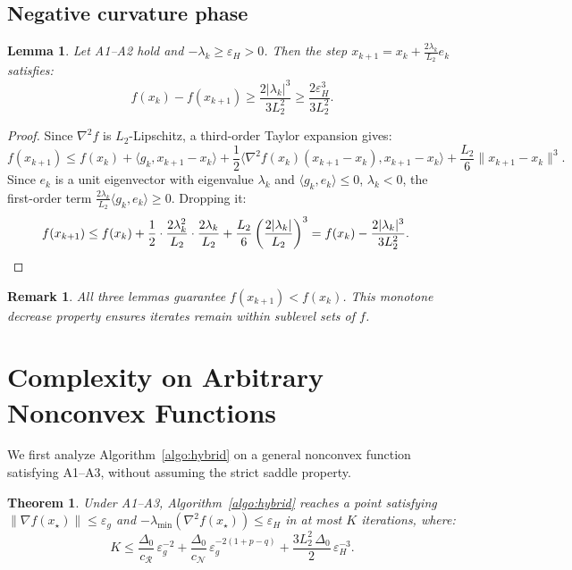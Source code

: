 \documentclass{article}
\newtheorem{lemma}{Lemma}
\newtheorem{theorem}{Theorem}
\newtheorem{remark}{Remark}
\begin{document}
\subsection{Negative curvature phase}

\begin{lemma}
\label{lem:decrease_NCD}
Let A1--A2 hold and $-\lambda_k \geq \varepsilon_H > 0$. Then the step $x_{k+1} = x_k + \frac{2\lambda_k}{L_2}e_k$ satisfies:
\begin{equation}
\label{eq:decrease_NCD}
f(x_k) - f(x_{k+1}) \geq \frac{2|\lambda_k|^3}{3L_2^2} \geq \frac{2\varepsilon_H^3}{3L_2^2}.
\end{equation}
\end{lemma}
\begin{proof}
Since $\nabla^2 f$ is $L_2$-Lipschitz, a third-order Taylor expansion gives:
\[
f(x_{k+1}) \leq f(x_k) + \langle g_k, x_{k+1} - x_k \rangle + \frac{1}{2}\langle \nabla^2 f(x_k)(x_{k+1} - x_k), x_{k+1} - x_k \rangle + \frac{L_2}{6}\|x_{k+1} - x_k\|^3.
\]
Since $e_k$ is a unit eigenvector with eigenvalue $\lambda_k$ and $\langle g_k, e_k \rangle \leq 0$, $\lambda_k < 0$, the first-order term $\frac{2\lambda_k}{L_2}\langle g_k, e_k\rangle \geq 0$. Dropping it:
\begin{align*}
f(x_{k+1}) &\leq f(x_k) + \frac{1}{2}\cdot\frac{2\lambda_k^2}{L_2}\cdot\frac{2\lambda_k}{L_2} + \frac{L_2}{6}\left(\frac{2|\lambda_k|}{L_2}\right)^3 = f(x_k) - \frac{2|\lambda_k|^3}{3L_2^2}. \qedhere
\end{align*}
\end{proof}

\begin{remark}
\label{rem:monotone}
All three lemmas guarantee $f(x_{k+1}) < f(x_k)$. This monotone decrease property ensures iterates remain within sublevel sets of $f$.
\end{remark}


\section{Complexity on Arbitrary Nonconvex Functions}
\label{sec:arbitrary}

We first analyze Algorithm~\ref{algo:hybrid} on a general nonconvex function satisfying A1--A3, without assuming the strict saddle property.

\begin{theorem}
\label{thm:arbitrary}
Under A1--A3, Algorithm~\ref{algo:hybrid} reaches a point satisfying $\|\nabla f(x_\star)\| \leq \varepsilon_g$ and $-\lambda_{\min}(\nabla^2 f(x_\star)) \leq \varepsilon_H$ in at most $K$ iterations, where:
\begin{equation}
\label{eq:bound_arbitrary}
K \leq \frac{\Delta_0}{c_{\mathcal{R}}}\,\varepsilon_g^{-2} + \frac{\Delta_0}{c_{\mathcal{N}}}\,\varepsilon_g^{-2(1+p-q)} + \frac{3L_2^2\,\Delta_0}{2}\,\varepsilon_H^{-3}.
\end{equation}
\end{theorem}
\end{document}
